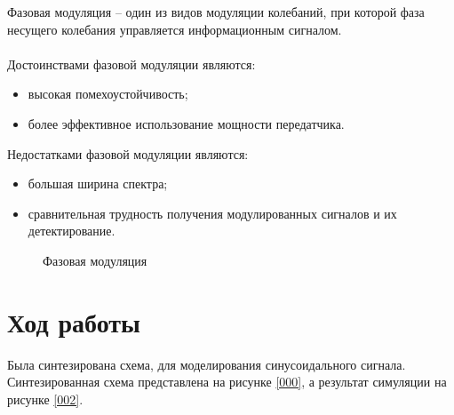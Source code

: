 \documentclass[a4paper,14pt]{extarticle}
\begin{document}
Фазовая модуляция -- один из видов модуляции колебаний, при которой фаза несущего колебания управляется информационным сигналом.\\\\
Достоинствами фазовой модуляции являются:
\begin{itemize}
\item высокая помехоустойчивость;
\item более эффективное использование мощности передатчика.\\
\end{itemize}
Недостатками фазовой модуляции являются:
\begin{itemize}
\item большая ширина спектра;
\item сравнительная трудность получения модулированных сигналов и их детектирование.\\
\end{itemize}

\begin{figure}[H]
\caption{Фазовая модуляция}
\end{figure}

\newpage

\section{Ход работы}

Была синтезирована схема, для моделирования синусоидального сигнала. 
Синтезированная схема представлена на рисунке \ref{000}, а результат симуляции на рисунке \ref{002}.
\end{document}
